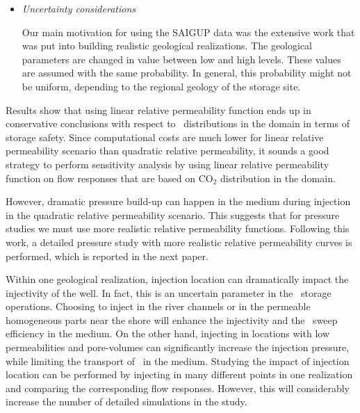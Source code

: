 {\begin{itemize}
To accelerate the flow simulation, we used linear relative permeability curves. This
increases the flow mobility in the low saturation values. However, in \coo-water system the relative permeability curves are closer to a quadratic function. Hysteresis effects are
modeled by changing the endpoints in the relative permeability curves and no
scanning-curves is considered here. During injection, the main process is
drainage. After injection, the imbibition process starts and mostly is a
replacement of \coo\ by water due to gravity segregation. This justifies
the usage of simple hysteresis model, and more detailed study can be done to
investigate this influence in a quantitative manner. 

\item \textit{Uncertainty considerations}

Our main motivation for using the SAIGUP data was the extensive work that was put into building realistic geological realizations. The geological parameters are changed in value between low and high levels. These values are assumed with the same probability. In general, this probability might not be uniform, depending to the regional geology of the storage site. 

\end{itemize}
Results show that using linear relative permeability function ends up in
conservative conclusions with respect to \coo\ distributions in the
domain in terms of storage safety. Since computational costs are much lower for
linear relative permeability scenario than quadratic relative permeability, it
sounds a good strategy to perform sensitivity analysis by using linear relative
permeability function on flow responses that are based on $\mbox{CO}_2$
distribution in the domain.

However, dramatic pressure build-up can happen in the medium during injection
in the quadratic relative permeability scenario. This suggests that for
pressure studies we must use more realistic relative permeability functions.
 Following this work, a detailed pressure study with more realistic relative
permeability curves is performed, which is reported in the next paper.

Within one geological realization, injection location can dramatically impact the injectivity of the well. In fact, this is an uncertain parameter in the \coo\ storage operations. Choosing to inject in the river channels or in the permeable homogeneous parts near the shore will enhance the injectivity and the \coo\ sweep efficiency in the medium. On the other hand, injecting in locations with low permeabilities and pore-volumes can significantly increase the injection pressure, while limiting the transport of \coo\ in the medium. Studying the impact of injection location can be performed by injecting in many different points in one realization and comparing the corresponding flow responses. However, this will considerably increase the number of detailed simulations in the study. 

}
